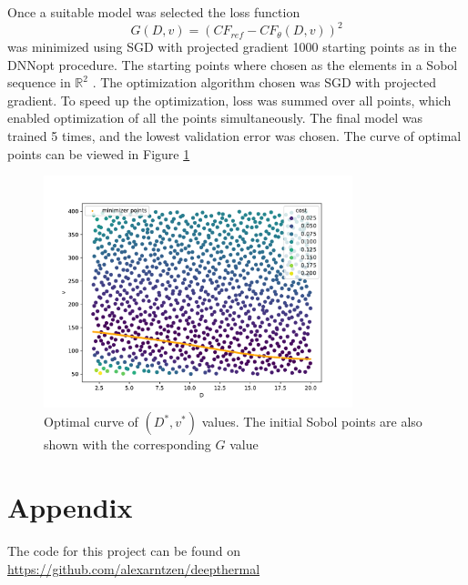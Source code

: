 \documentclass[a4paper]{article}
\newcommand{\R}{\mathbb{R}}
\begin{document}
Once a suitable model was selected the loss function
\begin{equation}
	G(D,v) = (CF_{ref}- CF_{\theta}(D,v))^2
\end{equation}
was minimized using SGD with projected gradient 1000 starting points as in the DNNopt\cite{Lye_2021} procedure. The starting points where chosen as the elements in a Sobol sequence in $\R^2$ . The optimization algorithm chosen was SGD with projected gradient. To speed up the optimization, loss was summed over all points, which enabled optimization of all the points simultaneously. The final model was trained 5 times, and the lowest validation error was chosen. The curve of optimal points can be viewed in Figure \ref{fig:task5}

\begin{figure}[t]
    \centering
    \includegraphics[width=0.8\textwidth]{figures/task5/final_optim_points.pdf}
    \caption{Optimal curve of $(D^*,v^*)$ values. The initial Sobol points are also shown with the corresponding $G$ value}
    \label{fig:task5}
\end{figure}

\section*{Appendix}
The code for this project can be found on \url{https://github.com/alexarntzen/deepthermal}

\FloatBarrier
\printbibliography
\end{document}
